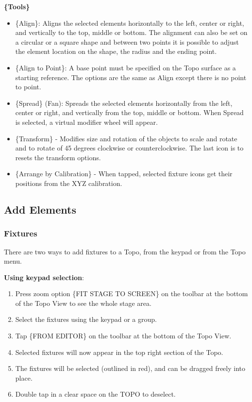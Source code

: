 \documentclass[
]{article}
\begin{document}
\textbf{\{Tools\}}

\begin{itemize}
\item
  \{Align\}: Aligns the selected elements horizontally to the left, center or right, and vertically to the top, middle or bottom. The alignment can also be set on a circular or a square shape and between two points it is possible to adjust the element location on the shape, the radius and the ending point.
\item
  \{Align to Point\}: A base point must be specified on the Topo surface as a starting reference. The options are the same as Align except there is no point to point.
\item
  \{Spread\} (Fan): Spreads the selected elements horizontally from the left, center or right, and vertically from the top, middle or bottom. When Spread is selected, a virtual modifier wheel will appear.
\item
  \{Transform\} - Modifies size and rotation of the objects to scale and rotate and to rotate of 45 degrees clockwise or counterclockwise. The last icon is to resets the transform options.
\item
  \{Arrange by Calibration\} - When tapped, selected fixture icons get their positions from the XYZ calibration.
\end{itemize}

\hypertarget{Add-Elements-15.3}{%
\subsection{Add Elements}\label{Add-Elements-15.3}}

\hypertarget{fixtures}{%
\subsubsection{Fixtures}\label{fixtures}}

There are two ways to add fixtures to a Topo, from the keypad or from the Topo menu.

\textbf{Using keypad selection}:

\begin{enumerate}
\def\labelenumi{\arabic{enumi}.}
\item
  Press zoom option \{FIT STAGE TO SCREEN\} on the toolbar at the bottom of the Topo View to see the whole stage area.
\item
  Select the fixtures using the keypad or a group.
\item
  Tap \{FROM EDITOR\} on the toolbar at the bottom of the Topo View.
\item
  Selected fixtures will now appear in the top right section of the Topo.
\item
  The fixtures will be selected (outlined in red), and can be dragged freely into place.
\item
  Double tap in a clear space on the TOPO to deselect.
\end{enumerate}
\end{document}
